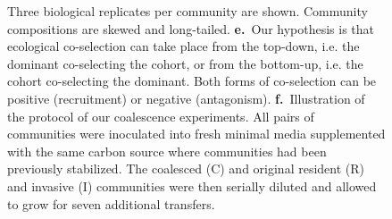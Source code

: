 \documentclass[a4paper,10pt]{article}
\begin{document}
\begin{figure}[!h]
{Three biological replicates per community are shown.
Community compositions are skewed and long-tailed.
\textbf{e.}~Our hypothesis is that ecological co-selection can take place from the top-down,
i.e. the dominant co-selecting the cohort, or from the bottom-up, i.e. the cohort co-selecting
the dominant. Both forms of co-selection can be positive (recruitment) or negative
(antagonism).
\textbf{f.}~Illustration of the protocol of our coalescence experiments. All pairs of
communities were inoculated into fresh minimal media supplemented with the same carbon
source where communities had been previously stabilized. The coalesced (C) and original
resident (R) and invasive (I) communities were then serially diluted and allowed to grow
for seven additional transfers.}
\label{fig1}
\end{figure}

\clearpage
\end{document}
